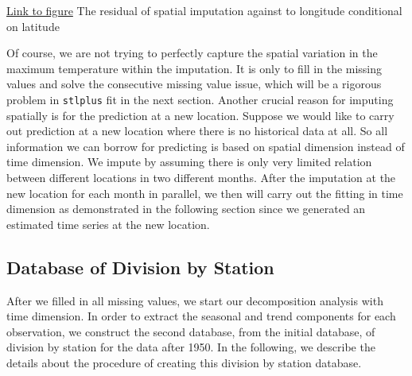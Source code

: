 \begin{framed}
\begin{center}
  \href{../plots/a1950/spaimpute/elev/d2/span0.015/a1950.spaResid.vs.lon.lat.pdf}
  {Link to figure}
  {The residual of spatial imputation against to longitude conditional on latitude}
  \label{elev.0.015.Residvslon.lat}
\end{center}
\end{framed}

Of course, we are not trying to perfectly capture the spatial variation in the
maximum temperature within the imputation. It is only to fill in the missing 
values and solve the consecutive missing value issue, which will be a rigorous 
problem in \texttt{stlplus} fit in the next section. Another crucial reason for
imputing spatially is for the prediction at a new location. Suppose we would like
to carry out prediction at a new location where there is no historical data at
all. So all information we can borrow for predicting is based on spatial dimension 
instead of time dimension. We impute by assuming there is only very limited 
relation between different locations in two different months. After the imputation
at the new location for each month in parallel, we then will carry out the fitting
in time dimension as demonstrated in the following section since we generated an 
estimated time series at the new location.


\subsection{Database of Division by Station}
\label{sec:a1950.divibyStation}

After we filled in all missing values, we start our decomposition analysis with 
time dimension. In order to extract the seasonal and trend components for each 
observation, we construct the second database, from the initial database, of 
division by station for the data after 1950. In the following, we describe the 
details about the procedure of creating this division by station database.

